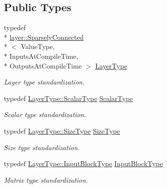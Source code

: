 \subsection*{Public Types}
\begin{DoxyCompactItemize}
\item 
typedef \\*
\hyperlink{classffnn_1_1layer_1_1_sparsely_connected}{layer\-::\-Sparsely\-Connected}\\*
$<$ Value\-Type, \\*
Inputs\-At\-Compile\-Time, \\*
Outputs\-At\-Compile\-Time $>$ \hyperlink{classffnn_1_1optimizer_1_1_gradient_descent_3_01layer_1_1_sparsely_connected_3_01_value_type_00_e6c27913ab0d90f52f73031aa88c19bf_a87c420b734238a0c01d9928d224c649a}{Layer\-Type}
\begin{DoxyCompactList}\small\item\em Layer type standardization. \end{DoxyCompactList}\item 
typedef \hyperlink{classffnn_1_1layer_1_1_sparsely_connected_abe2b75254f39c0bec9f02b2e906e7919}{Layer\-Type\-::\-Scalar\-Type} \hyperlink{classffnn_1_1optimizer_1_1_gradient_descent_3_01layer_1_1_sparsely_connected_3_01_value_type_00_e6c27913ab0d90f52f73031aa88c19bf_adec062ac850983eca0cce2f84342f8fc}{Scalar\-Type}
\begin{DoxyCompactList}\small\item\em Scalar type standardization. \end{DoxyCompactList}\item 
typedef \hyperlink{classffnn_1_1layer_1_1_sparsely_connected_a86b75c2723c1f8b6771224257f5eb1c1}{Layer\-Type\-::\-Size\-Type} \hyperlink{classffnn_1_1optimizer_1_1_gradient_descent_3_01layer_1_1_sparsely_connected_3_01_value_type_00_e6c27913ab0d90f52f73031aa88c19bf_a98715d1de7ba21998f64ec8e80051858}{Size\-Type}
\begin{DoxyCompactList}\small\item\em Size type standardization. \end{DoxyCompactList}\item 
typedef \hyperlink{classffnn_1_1layer_1_1_sparsely_connected_ad90fd9b4c687e4dc515cf8ca2796043c}{Layer\-Type\-::\-Input\-Block\-Type} \hyperlink{classffnn_1_1optimizer_1_1_gradient_descent_3_01layer_1_1_sparsely_connected_3_01_value_type_00_e6c27913ab0d90f52f73031aa88c19bf_a06fa3b5a9d654609c0d90dcc09382e38}{Input\-Block\-Type}
\begin{DoxyCompactList}\small\item\em Matrix type standardization. \end{DoxyCompactList}\item 

\end{DoxyCompactItemize}

